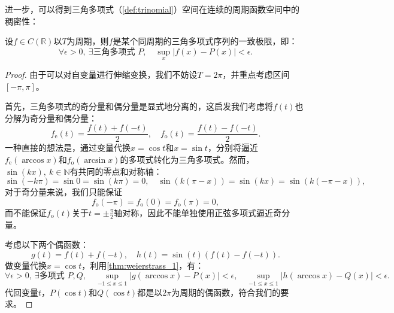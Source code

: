 进一步，可以得到三角多项式（\cref{def:trinomial}）空间在连续的周期函数空间中的稠密性：
\begin{corollary}[Weierstrass第二逼近定理]\label{cor:weierstrass_2}
    设$f\in C(\mathbb{R})$以$T$为周期，则$f$是某个同周期的三角多项式序列的一致极限，即：
    \begin{equation}
        \forall \epsilon>0,\ \exists \text{三角多项式 } P,\quad \sup_{x}|f(x)-P(x)|<\epsilon.
    \end{equation}
\end{corollary}
\begin{proof}
    由于可以对自变量进行伸缩变换，我们不妨设$T=2\pi$，并重点考虑区间$[-\pi,\pi]$。

    首先，三角多项式的奇分量和偶分量是显式地分离的，这启发我们考虑将$f(t)$也分解为奇分量和偶分量：
    \begin{equation}
        f_{\mathrm{e}}(t)=\frac{f(t)+f(-t)}{2},\quad f_{\mathrm{o}}(t)=\frac{f(t)-f(-t)}{2}.
    \end{equation}
    一种直接的想法是，通过变量代换$x=\cos t$和$x=\sin t$，分别将逼近$f_{\mathrm{e}}(\arccos x)$和$f_{\mathrm{o}}(\arcsin x)$的多项式转化为三角多项式。然而，$\sin(k x),\ k\in\mathbb{N}$有共同的零点和对称轴：
    \begin{equation}
        \sin(-k\pi)=\sin 0=\sin(k\pi)=0,\quad \sin(k(\pi-x))=\sin(kx)=\sin(k(-\pi-x)),
    \end{equation}
    对于奇分量来说，我们只能保证
    \begin{equation}
        f_{\mathrm{o}}(-\pi)=f_{\mathrm{o}}(0)=f_{\mathrm{o}}(\pi)=0,
    \end{equation}
    而不能保证$f_{\mathrm{o}}(t)$关于$t=\pm\displaystyle\frac{\pi}{2}$轴对称，因此不能单独使用正弦多项式逼近奇分量。

    考虑以下两个偶函数：
    \begin{equation}
        g(t)=f(t)+f(-t),\quad h(t)=\sin(t)(f(t)-f(-t)).
    \end{equation}
    做变量代换$x=\cos t$，利用\cref{thm:weierstrass_1}，有：
    \begin{equation}
        \forall \epsilon>0,\ \exists \text{多项式 } P,Q,\quad \sup_{-1\leq x\leq 1}|g(\arccos x)-P(x)|<\epsilon,\quad \sup_{-1\leq x\leq 1}|h(\arccos x)-Q(x)|<\epsilon.
    \end{equation}
    代回变量$t$，$P(\cos t)$和$Q(\cos t)$都是以$2\pi$为周期的偶函数，符合我们的要求。


\end{proof}

